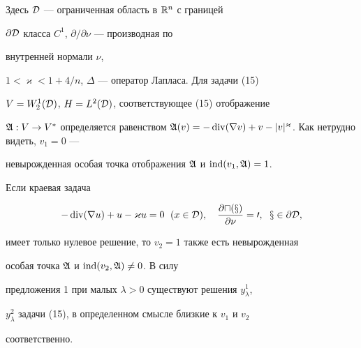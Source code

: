 Здесь $\cal D$ --- ограниченная область в $\Bbb R^n$ с границей 


$\partial\cal D$ класса $C^1$, $\partial/\partial\nu$ --- производная по 


внутренней нормали $\nu$, 


$1<\varkappa<1+4/n$, $\Delta$ --- оператор Лапласа. Для задачи (15) 


$V=W^1_2(\cal D)$, $H=L^2(\cal D)$, соответствующее (15) отображение 


$\frak A:V\to V^*$ определяется равенством $\frak A(v)=-\Div(\nabla 


v)+v-|v|^\varkappa$. Как нетрудно видеть, $v_1=0$ --- 


невырожденная особая точка отображения $\frak A$ и $\operatorname{ind}(v_1,\frak A)=1$. 


Если краевая задача 


$$ 


-\Div(\nabla u)+u-\varkappa u=0\ \; (x\in\cal D),\quad 


\frac{\partial u(x)}{\partial\nu}=0,\ \; x\in\partial\cal D, 


$$ 


имеет только нулевое решение, то $v_2=1$ также есть невырожденная 


особая точка $\frak A$ и $\operatorname{ind}(v_2,\frak A)\ne0$. В силу 


предложения 1 при малых $\lambda>0$ существуют решения $y^1_\lambda$, 


$y^2_\lambda$ задачи (15), в определенном смысле близкие к $v_1$ и $v_2$ 


соответственно. 


 


